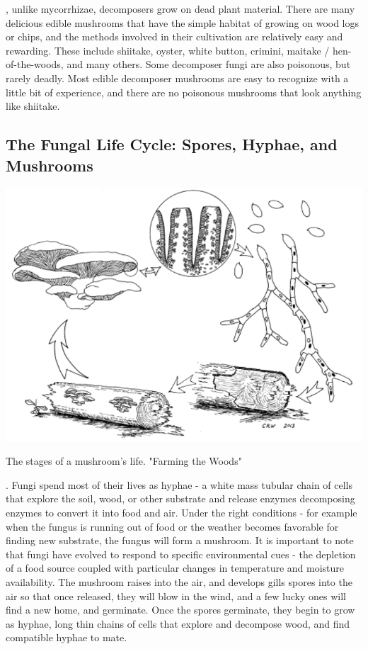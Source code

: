 \documentclass{tufte-handout}
\begin{document}
, unlike mycorrhizae, decomposers grow on dead plant material.  
There are many delicious edible mushrooms that have the simple habitat of growing on wood logs or chips, and the methods involved in their cultivation are relatively easy and rewarding. 
These include shiitake, oyster, white button, crimini, maitake / hen-of-the-woods, and many others.
Some decomposer fungi are also poisonous, but rarely deadly. 
Most edible decomposer mushrooms are easy to recognize with a little bit of experience, and there are no poisonous mushrooms that look anything like shiitake.

\subsection{The Fungal Life Cycle: Spores, Hyphae, and Mushrooms}

\begin{marginfigure}
\includegraphics{figures/crw-mushroom-lifecycle}
\caption{The stages of a mushroom's life. "Farming the Woods"}
\end{marginfigure}

. 
Fungi spend most of their lives as hyphae - a white mass tubular chain of cells that explore the soil, wood, or other substrate and release enzymes decomposing enzymes to convert it into food and air. 
Under the right conditions - for example when the fungus is running out of food or the weather becomes favorable for finding new substrate, the fungus will form a mushroom.
It is important to note that fungi have evolved to respond to specific environmental cues - the depletion of a food source coupled with particular changes in temperature and moisture availability. 
The mushroom raises into the air, and develops gills spores into the air so that once released, they will blow in the wind, and a few lucky ones will find a new home, and germinate.
Once the spores germinate, they begin to grow as hyphae, long thin chains of cells that explore and decompose wood, and find compatible hyphae to mate.
\end{document}
